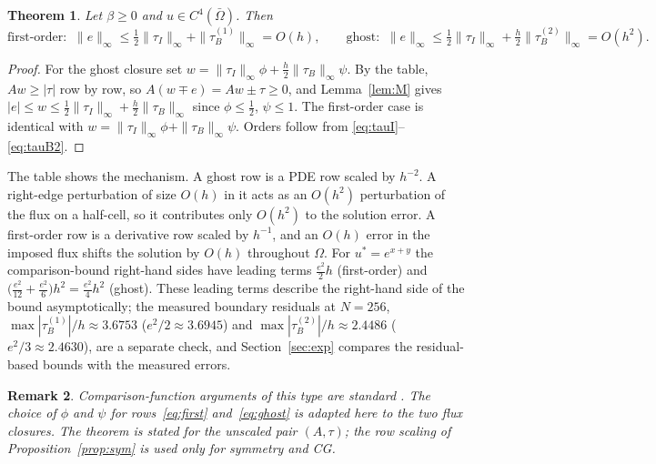 \documentclass[11pt,a4paper]{article}
\theoremstyle{palplain}
\newtheorem{theorem}{Theorem}[section]
\theoremstyle{paldef}
\theoremstyle{palremark}
\newtheorem{remark}[theorem]{Remark}
\begin{document}
\begin{theorem}\label{thm:conv}
Let $\beta\ge0$ and $u\in C^4(\bar\Omega)$. Then
\[
\text{first-order: }\ \|e\|_\infty\le\tfrac12\|\tau_I\|_\infty+\|\tau^{(1)}_B\|_\infty=O(h),\qquad
\text{ghost: }\ \|e\|_\infty\le\tfrac12\|\tau_I\|_\infty+\tfrac h2\|\tau^{(2)}_B\|_\infty=O(h^2).
\]
\end{theorem}
\begin{proof}
For the ghost closure set $w=\|\tau_I\|_\infty\phi+\tfrac h2\|\tau_B\|_\infty\psi$. By the
table, $Aw\ge|\tau|$ row by row, so $A(w\mp e)=Aw\pm\tau\ge0$, and Lemma~\ref{lem:M} gives
$|e|\le w\le\tfrac12\|\tau_I\|_\infty+\tfrac h2\|\tau_B\|_\infty$ since $\phi\le\tfrac12$,
$\psi\le1$. The first-order case is identical with $w=\|\tau_I\|_\infty\phi+\|\tau_B\|_\infty\psi$.
Orders follow from \eqref{eq:tauI}--\eqref{eq:tauB2}.
\end{proof}
The table shows the mechanism. A ghost row is a PDE row scaled by $h^{-2}$. A right-edge
perturbation of size $O(h)$ in it acts as an $O(h^2)$ perturbation of the flux on a half-cell,
so it contributes only $O(h^2)$ to the solution error. A first-order row is a derivative row
scaled by $h^{-1}$, and an $O(h)$ error in the imposed flux shifts the solution by $O(h)$
throughout $\Omega$. For $u^*=e^{x+y}$ the comparison-bound right-hand sides have leading terms
$\tfrac{e^2}{2}h$ (first-order) and $\bigl(\tfrac{e^2}{12}+\tfrac{e^2}{6}\bigr)h^2=\tfrac{e^2}{4}h^2$
(ghost). These leading terms describe the right-hand side of the bound asymptotically; the
measured boundary residuals at $N=256$, $\max|\tau_B^{(1)}|/h\approx3.6753$ ($e^2/2\approx3.6945$)
and $\max|\tau_B^{(2)}|/h\approx2.4486$ ($e^2/3\approx2.4630$), are a separate check, and
Section~\ref{sec:exp} compares the residual-based bounds with the measured errors.

\begin{remark}
Comparison-function arguments of this type are standard \cite{leveque,morton}. The choice of
$\phi$ and $\psi$ for rows~\eqref{eq:first} and~\eqref{eq:ghost} is adapted here to the two flux
closures. The theorem is stated for the unscaled pair $(A,\tau)$; the row scaling of
Proposition~\ref{prop:sym} is used only for symmetry and CG.
\end{remark}

\end{document}
